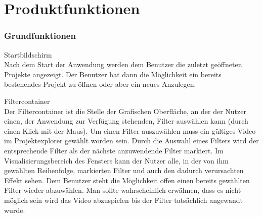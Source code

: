 \chapter {Produktfunktionen}

\subsection{Grundfunktionen}
\setcounter{counterKriterien}{0}
 Startbildschirm \\
Nach dem Start der Anwendung werden dem Benutzer die zuletzt geöffneten Projekte angezeigt. Der Benutzer
hat dann die Möglichkeit ein bereits bestehendes Projekt zu öffnen oder aber ein neues Anzulegen.
 
 Filtercontainer \\
Der Filtercontainer ist die Stelle der Grafischen Oberfläche, an der der Nutzer einen, der Anwendung
zur Verfügung stehenden, Filter auswählen kann (durch einen Klick mit der Maus). Um einen Filter auszuwählen
muss ein gültiges Video im Projektexplorer gewählt worden sein. Durch die Auswahl eines Filters wird
der entsprechende Filter als der nächste anzuwendende Filter markiert. Im Visualisierungsbereich des
Fensters kann der Nutzer alle, in der von ihm gewählten Reihenfolge, markierten Filter und auch den
dadurch verursachten Effekt sehen. Dem Benutzer steht die Möglichkeit offen einen bereits gewählten
Filter wieder abzuwählen.
 Man sollte wahrscheinlich erwähnen, dass es nicht möglich sein wird das Video abzuspielen bis der Filter 
 tatsächlich angewandt wurde.

